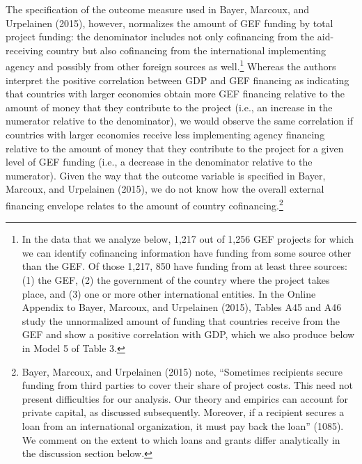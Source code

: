 \documentclass{article}
\begin{document}
The specification of the outcome measure used in Bayer, Marcoux, and Urpelainen (2015), however, normalizes the amount of GEF funding by total project funding: the denominator includes not only cofinancing from the aid-receiving country but also cofinancing from the international implementing agency and possibly from other foreign sources as well.\footnote{In the data that we analyze below, 1,217 out of 1,256 GEF projects for which we can identify cofinancing information have funding from some source other than the GEF. Of those 1,217, 850 have funding from at least three sources: (1) the GEF, (2) the government of the country where the project takes place, and (3) one or more other international entities.  In the Online Appendix to Bayer, Marcoux, and Urpelainen (2015), Tables A45 and A46 study the unnormalized amount of funding that countries receive from the GEF and show a positive correlation with GDP, which we also produce below in Model 5 of Table 3.} Whereas the authors interpret the positive correlation between GDP and GEF financing as indicating that countries with larger economies obtain more GEF financing relative to the amount of money that they contribute to the project (i.e., an increase in the numerator relative to the denominator), we would observe the same correlation if countries with larger economies receive less implementing agency financing relative to the amount of money that they contribute to the project for a given level of GEF funding (i.e., a decrease in the denominator relative to the numerator).  Given the way that the outcome variable is specified in Bayer, Marcoux, and Urpelainen (2015), we do not know how the overall external financing envelope relates to the amount of country cofinancing.\footnote{Bayer, Marcoux, and Urpelainen (2015) note, “Sometimes recipients secure funding from third parties to cover their share of project costs.  This need not present difficulties for our analysis.  Our theory and empirics can account for private capital, as discussed subsequently.  Moreover, if a recipient secures a loan from an international organization, it must pay back the loan” (1085).  We comment on the extent to which loans and grants differ analytically in the discussion section below.} 
\end{document}
